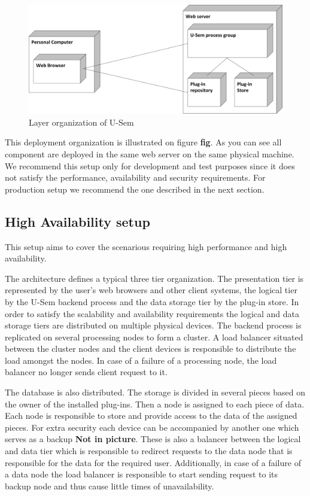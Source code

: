 \begin{figure}[h!]
  \centering
  	\includegraphics[scale=0.70]{plug-in/layers/simple_setup.png}
  \caption{Layer organization of U-Sem}
\end{figure}

This deployment organization is illustrated on figure \textbf{fig}. As you can see all component are deployed in the same web server on the same physical machine. We recommend this setup only for development and test purposes since it does not satisfy the performance, availability and security requirements. For production setup we recommend the one described in the next section.

\subsection{High Availability setup} 

This setup aims to cover the scenarious requiring high performance and high availability.

The architecture defines a typical three tier organization. The presentation tier is represented by the user's web browsers and other client systems, the logical tier by the U-Sem backend process and the data storage tier by the plug-in store. In order to satisfy the scalability and availability requirements the logical and data storage tiers are distributed on multiple physical
devices. The backend process is replicated on several processing nodes to form a cluster. A load balancer situated between the cluster nodes and the client devices is responsible to distribute the load amongst the nodes. In case of a failure of a processing node, the load balancer no longer sends client request to it.

The database is also distributed. The storage is divided in several pieces based on the owner of the installed plug-ins. Then a node is assigned to each piece of data. Each node is responsible to store and provide access to the data of the assigned pieces. For extra security each device can be accompanied by another one which serves as a backup \textbf{Not in picture}. These is also a balancer between the logical and data tier which is responsible to redirect requests to the data node that is responsible for the data for the required user. Additionally, in case of a failure of a data node the load balancer is responsible to start sending request to its backup node and thus cause little times of unavailability.

